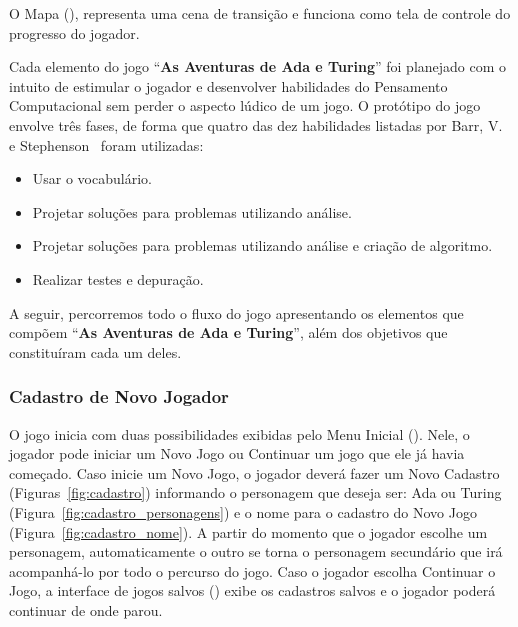 O Mapa (), representa uma cena de transição e funciona como tela de controle do progresso do jogador.





Cada elemento do jogo “\textbf{As Aventuras de Ada e Turing}” foi planejado com o intuito de estimular o jogador e desenvolver habilidades do Pensamento Computacional sem perder o aspecto lúdico de um jogo. O protótipo do jogo envolve três fases, de forma que quatro das dez habilidades listadas por Barr, V. e Stephenson~\cite{barr_bringing_2011} foram utilizadas:

\begin{itemize}
	\item Usar o vocabulário.
	\item Projetar soluções para problemas utilizando análise.
	\item Projetar soluções para problemas utilizando análise e criação de algoritmo.
	\item Realizar testes e depuração.
\end{itemize}

A seguir, percorremos todo o fluxo do jogo apresentando os elementos que compõem “\textbf{As Aventuras de Ada e Turing}”, além dos objetivos que constituíram cada um deles.

\subsubsection{Cadastro de Novo Jogador} \label{sssec:cadastro}

O jogo inicia com duas possibilidades exibidas pelo Menu Inicial (). Nele, o jogador pode iniciar um Novo Jogo ou Continuar um jogo que ele já havia começado. Caso inicie um Novo Jogo, o jogador deverá fazer um Novo Cadastro (Figuras~\ref{fig:cadastro}) informando o personagem que deseja ser: Ada ou Turing (Figura~\ref{fig:cadastro_personagens}) e o nome para o cadastro do Novo Jogo (Figura~\ref{fig:cadastro_nome}). A partir do momento que o jogador escolhe um personagem, automaticamente o outro se torna o personagem secundário que irá acompanhá-lo por todo o percurso do jogo. Caso o jogador escolha Continuar o Jogo, a interface de jogos salvos () exibe os cadastros salvos e o jogador poderá continuar de onde parou.

